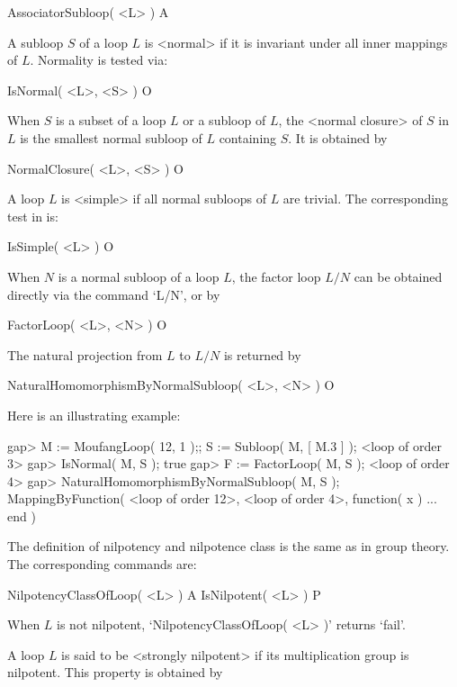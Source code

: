\>AssociatorSubloop( <L> )  A


A subloop $S$ of a loop $L$ is <normal> if it is
invariant under all inner mappings of $L$. Normality is tested via:

\>IsNormal( <L>, <S> ) O

When $S$ is a subset of a loop $L$ or a subloop of $L$, the <normal
closure> of $S$ in $L$ is the smallest normal subloop of
$L$ containing $S$. It is obtained by

\>NormalClosure( <L>, <S> ) O

A loop $L$ is <simple> if all normal subloops of $L$ are
trivial. The corresponding test in {\LOOPS} is:

\>IsSimple( <L> ) O


When $N$ is a normal subloop of a loop $L$, the factor loop $L/N$ can be
obtained directly via the command `L/N', or by

\>FactorLoop( <L>, <N> ) O

The natural projection from $L$ to $L/N$ is returned by

\>NaturalHomomorphismByNormalSubloop( <L>, <N> ) O

Here is an illustrating example:

\beginexample
gap> M := MoufangLoop( 12, 1 );; S := Subloop( M, [ M.3 ] );
<loop of order 3>
gap> IsNormal( M, S );
true
gap> F := FactorLoop( M, S );
<loop of order 4>
gap> NaturalHomomorphismByNormalSubloop( M, S );
MappingByFunction( <loop of order 12>, <loop of order 4>,
    function( x ) ... end )
\endexample


The definition of nilpotency and nilpotence class is the same as in group
theory. The corresponding commands are:

\>NilpotencyClassOfLoop( <L> ) A
\>IsNilpotent( <L> ) P

When $L$ is not nilpotent, `NilpotencyClassOfLoop( <L> )' returns `fail'.

A loop $L$ is said to be <strongly nilpotent> if
its multiplication group is nilpotent. This property is obtained by

